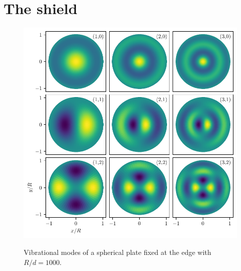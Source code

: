\chapter{The shield}\label{cha:the-shield}

\begin{figure}[!htbp]
  \centering
  \includegraphics[width=\textwidth]{./../figures/vibrational-modes.pdf}
  \label{fig:vibrational-modes}
  \caption{Vibrational modes of a spherical plate fixed at the edge with $R/d = 1000$.}
\end{figure}
